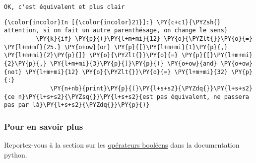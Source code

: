     \begin{Verbatim}[commandchars=\\\{\},frame=single,framerule=0.3mm,rulecolor=\color{cellframecolor}]
OK, c'est équivalent et plus clair
\end{Verbatim}

    \begin{Verbatim}[commandchars=\\\{\},frame=single,framerule=0.3mm,rulecolor=\color{cellframecolor}]
{\color{incolor}In [{\color{incolor}21}]:} \PY{c+c1}{\PYZsh{} attention, si on fait un autre parenthésage, on change le sens}
         \PY{k}{if} \PY{p}{(}\PY{l+m+mi}{12} \PY{o}{\PYZlt{}}\PY{o}{=} \PY{l+m+mf}{25.} \PY{o+ow}{or} \PY{p}{[}\PY{l+m+mi}{1}\PY{p}{,} \PY{l+m+mi}{2}\PY{p}{]} \PY{o}{\PYZlt{}}\PY{o}{=} \PY{p}{[}\PY{l+m+mi}{2}\PY{p}{,} \PY{l+m+mi}{3}\PY{p}{]}\PY{p}{)} \PY{o+ow}{and} \PY{o+ow}{not} \PY{l+m+mi}{12} \PY{o}{\PYZlt{}}\PY{o}{=} \PY{l+m+mi}{32} \PY{p}{:}
             \PY{n+nb}{print}\PY{p}{(}\PY{l+s+s2}{\PYZdq{}}\PY{l+s+s2}{ce n}\PY{l+s+s2}{\PYZsq{}}\PY{l+s+s2}{est pas équivalent, ne passera pas par là}\PY{l+s+s2}{\PYZdq{}}\PY{p}{)}
\end{Verbatim}


    \hypertarget{pour-en-savoir-plus}{%
\subsubsection{Pour en savoir plus}\label{pour-en-savoir-plus}}

    Reportez-vous à la section sur les
\href{https://docs.python.org/3/library/stdtypes.html\#truth-value-testing}{opérateurs
booléens} dans la documentation python.


    
    
    
